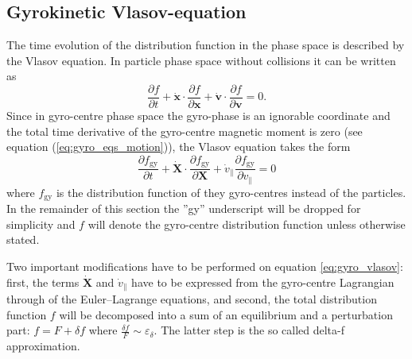 \documentclass[a4paper,10pt]{article}
\newcommand{\st}[1]{\mathrm{#1}} %
\begin{document}
\subsection{Gyrokinetic Vlasov-equation} \label{sec:vlasov}
The time evolution of the distribution function in the phase space is described by the Vlasov equation. In particle phase space without collisions it can be written as
\[ \frac{\partial f}{\partial t} + \dot{\mathbf{x}} \cdot \frac{\partial f}{\partial \mathbf{x}} + \dot{\mathbf{v}} \cdot \frac{\partial f}{\partial \mathbf{v}} = 0.\]
Since in gyro-centre phase space the gyro-phase is an ignorable coordinate and the total time derivative of the gyro-centre magnetic moment is zero (see equation (\ref{eq:gyro_eqs_motion})), the Vlasov equation takes the form
\begin{equation}
	\frac{\partial f_{\st{gy}}}{\partial t} + \dot{\mathbf{X}} \cdot \frac{\partial f_{\st{gy}}}{\partial \mathbf{X}} + \dot{v}_{\parallel} \frac{\partial f_{\st{gy}}}{\partial v_{\parallel}} = 0
	\label{eq:gyro_vlasov}
\end{equation}
where $f_{\st{gy}}$ is the distribution function of they gyro-centres instead of the particles. In the remainder of this section the ''gy'' underscript will be dropped for simplicity and $f$ will denote the gyro-centre distribution function unless otherwise stated. 

Two important modifications have to be performed on equation \ref{eq:gyro_vlasov}: first, the terms $\dot{\mathbf{X}}$ and $\dot{v}_{\parallel}$ have to be expressed from the gyro-centre Lagrangian through of the Euler--Lagrange equations, and second, the total distribution function $f$ will be decomposed into a sum of an equilibrium and a perturbation part: $f = F + \delta f$ where $\frac{\delta f}{F} \sim \varepsilon_{\delta}$. The latter step is the so called delta-f approximation. 

\end{document}
